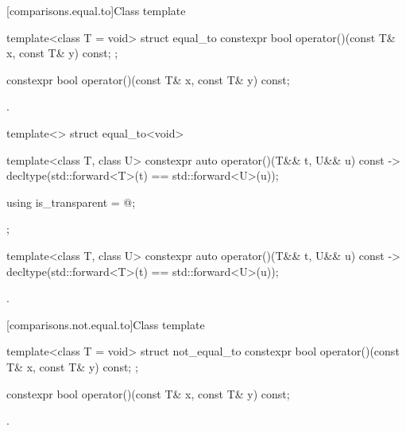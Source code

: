 [comparisons.equal.to]{Class template }

%
\begin{itemdecl}
template<class T = void> struct equal_to {
  constexpr bool operator()(const T& x, const T& y) const;
};
\end{itemdecl}

%
\begin{itemdecl}
constexpr bool operator()(const T& x, const T& y) const;
\end{itemdecl}

\begin{itemdescr}
\pnum
\returns
{}.
\end{itemdescr}

%
\begin{itemdecl}
template<> struct equal_to<void> {
  template<class T, class U> constexpr auto operator()(T&& t, U&& u) const
    -> decltype(std::forward<T>(t) == std::forward<U>(u));

  using is_transparent = @\unspec@;
};
\end{itemdecl}

%
\begin{itemdecl}
template<class T, class U> constexpr auto operator()(T&& t, U&& u) const
  -> decltype(std::forward<T>(t) == std::forward<U>(u));
\end{itemdecl}

\begin{itemdescr}
\pnum
\returns
{}.
\end{itemdescr}

[comparisons.not.equal.to]{Class template }

%
\begin{itemdecl}
template<class T = void> struct not_equal_to {
  constexpr bool operator()(const T& x, const T& y) const;
};
\end{itemdecl}

%
\begin{itemdecl}
constexpr bool operator()(const T& x, const T& y) const;
\end{itemdecl}

\begin{itemdescr}
\pnum
\returns
{}.
\end{itemdescr}

